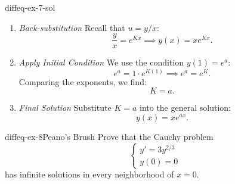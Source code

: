 \documentclass[preview]{standalone}
\begin{document}
\begin{snippetsolution}{diffeq-ex-7-sol}{}
\begin{enumerate}
        \[ \ln u = Kx. \]
        Solving for \( u \):
        \[ u = e^{Kx}. \]
        \item \emph{Back-substitution}
        Recall that \( u = y/x \):
        \[ \frac{y}{x} = e^{Kx} \implies y(x) = x e^{Kx}. \]
        \item \emph{Apply Initial Condition}
        We use the condition \( y(1) = e^a \):
        \[ e^a = 1 \cdot e^{K(1)} \implies e^a = e^K. \]
        Comparing the exponents, we find:
        \[ K = a. \]
        \item \emph{Final Solution}
        Substitute \( K = a \) into the general solution:
        \[ y(x) = x e^{ax}. \]
    \end{enumerate}
\end{snippetsolution}

\begin{snippetexercise}{diffeq-ex-8}{Peano's Brush}
    Prove that the Cauchy problem
    \[
        \begin{cases}
            y' = 3y^{2/3} \\
            y(0) = 0
        \end{cases}
    \]
    has infinite solutions in every neighborhood of \( x = 0 \).
\end{snippetexercise}
\end{document}
